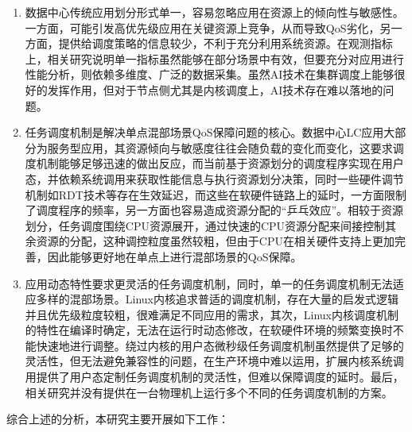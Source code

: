 \begin{enumerate}
    \item 数据中心传统应用划分形式单一，容易忽略应用在资源上的倾向性与敏感性。一方面，可能引发高优先级应用在关键资源上竞争，从而导致QoS劣化，另一方面，提供给调度策略的信息较少，不利于充分利用系统资源。在观测指标上，相关研究说明单一指标虽然能够在部分场景中有效，但要充分对应用进行性能分析，则依赖多维度、广泛的数据采集。虽然AI技术在集群调度上能够很好的发挥作用，但对于节点侧尤其是内核调度上，AI技术存在难以落地的问题。
    \item 任务调度机制是解决单点混部场景QoS保障问题的核心。数据中心LC应用大部分为服务型应用，其资源倾向与敏感度往往会随负载的变化而变化，这要求调度机制能够足够迅速的做出反应，而当前基于资源划分的调度程序实现在用户态，并依赖系统调用来获取性能信息与执行资源划分决策，同时一些硬件调节机制如RDT技术等存在生效延迟，而这些在软硬件链路上的延时，一方面限制了调度程序的频率，另一方面也容易造成资源分配的“乒乓效应”。相较于资源划分，任务调度围绕CPU资源展开，通过快速的CPU资源分配来间接控制其余资源的分配，这种调控粒度虽然较粗，但由于CPU在相关硬件支持上更加完善，因此能够更好地在单点上进行混部场景的QoS保障。
    \item 应用动态特性要求更灵活的任务调度机制，同时，单一的任务调度机制无法适应多样的混部场景。Linux内核追求普适的调度机制，存在大量的启发式逻辑并且优先级粒度较粗，很难满足不同应用的需求，其次，Linux内核调度机制的特性在编译时确定，无法在运行时动态修改，在软硬件环境的频繁变换时不能快速地进行调整。绕过内核的用户态微秒级任务调度机制虽然提供了足够的灵活性，但无法避免兼容性的问题，在生产环境中难以运用，扩展内核系统调用提供了用户态定制任务调度机制的灵活性，但难以保障调度的延时。最后，相关研究并没有提供在一台物理机上运行多个不同的任务调度机制的方案。
\end{enumerate}

综合上述的分析，本研究主要开展如下工作：

